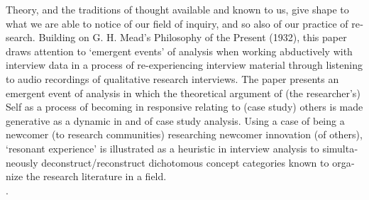     \begin{adjmulticols}{1}{10mm}{10mm}
\label{paper3:abstract}
    \bigskip
    \begin{otherlanguage}{english}
    {\small
    \fadebreak

\noindent Theory, and the traditions of thought available and known to us, give shape to what we are able to notice of our field of inquiry, and so also of our practice of research. Building on G. H. Mead’s Philosophy of the Present (1932), this paper draws attention to ‘emergent events’ of analysis when working abductively with interview data in a process of re-experiencing interview material through listening to audio recordings of qualitative research interviews. The paper presents an emergent event of analysis in which the theoretical argument of (the researcher’s) Self as a process of becoming in responsive relating to (case study) others is made generative as a dynamic in and of case study analysis. Using a case of being a newcomer (to research communities) researching newcomer innovation (of others), ‘resonant experience’ is illustrated as a heuristic in interview analysis to simultaneously deconstruct/reconstruct dichotomous concept categories known to organize the research literature in a field. 
%
\medskip
%
\\\hspace*{1.75em}{analysis, interview analysis, process ontology, resonant experience, emergent event, G. H. Mead}.





    } %

    \fadebreak

    \end{otherlanguage}

    \end{adjmulticols}